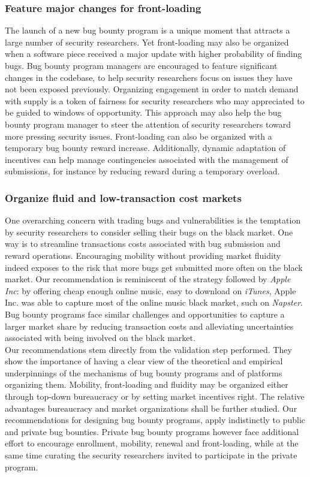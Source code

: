 \subsubsection{Feature major changes for front-loading}
The launch of a new bug bounty program is a unique moment that attracts a large number of security researchers. Yet front-loading may also be organized when a software piece received a major update with higher probability of finding bugs. Bug bounty program managers are encouraged to feature significant changes in the codebase, to help security researchers focus on issues they have not been exposed previously. Organizing engagement in order to match demand with supply is a token of fairness for security researchers who may appreciated to be guided to windows of opportunity. This approach may also help the bug bounty program manager to steer the attention of security researchers toward more pressing security issues. Front-loading can also be organized with a temporary bug bounty reward increase. Additionally, dynamic adaptation of incentives can help manage contingencies associated with the management of submissions, for instance by reducing reward during a temporary overload. 
 
\subsubsection{Organize fluid and low-transaction cost markets}
One overarching concern with trading bugs and vulnerabilities is the temptation by security researchers to consider selling their bugs on the black market. One way is to streamline transactions costs associated with bug submission and reward operations. Encouraging mobility without providing market fluidity indeed exposes to the risk that more bugs get submitted more often on the black market. Our recommendation is reminiscent of the strategy followed by {\it Apple Inc}: by offering cheap enough online music, easy to download on {\it iTunes}, Apple Inc. was able to capture most of the online music black market, such on {\it Napster}. Bug bounty programs face similar challenges and opportunities to capture a larger market share by reducing transaction costs and alleviating uncertainties associated with being involved on the black market.\\


Our recommendations stem directly from the validation step performed. They show the importance of having a clear view of the theoretical and empirical underpinnings of the mechanisms of bug bounty programs and of platforms organizing them. Mobility, front-loading and fluidity may be organized either through top-down bureaucracy or by setting market incentives right. The relative advantages bureaucracy and market organizations shall be further studied. Our recommendations for designing bug bounty programs, apply indistinctly to public and private bug bounties. Private bug bounty programs however face additional effort to encourage enrollment, mobility, renewal and front-loading, while at the same time curating the security researchers invited to participate in the private program. \\

